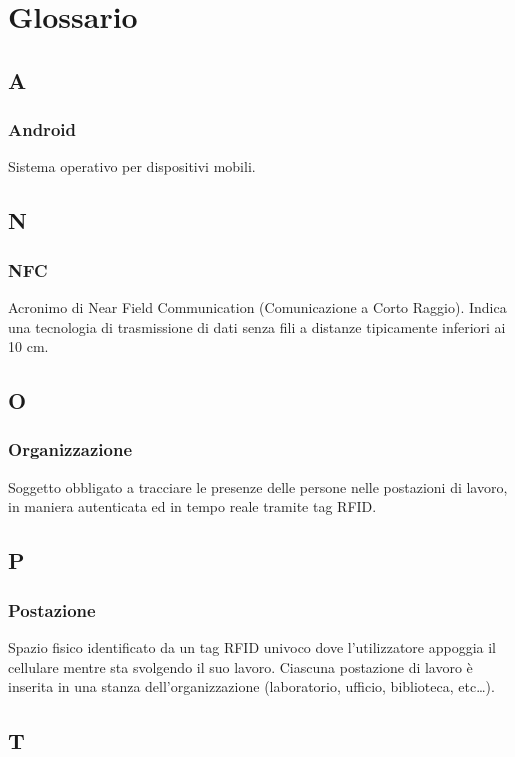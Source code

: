 \section{Glossario}


\subsection*{A}
\subsubsection*{Android} Sistema operativo per dispositivi mobili.

\subsection*{N}
\subsubsection*{NFC} Acronimo di Near Field Communication (Comunicazione a Corto Raggio). Indica una tecnologia di trasmissione di dati senza fili a distanze tipicamente inferiori ai 10 cm.

\subsection*{O}
\subsubsection*{Organizzazione} Soggetto obbligato a tracciare le presenze delle persone nelle postazioni di lavoro, in maniera autenticata ed in tempo reale tramite tag RFID. 
\subsection*{P}
\subsubsection*{Postazione} Spazio fisico identificato da un tag RFID univoco dove l’utilizzatore appoggia il cellulare mentre sta svolgendo il suo lavoro. Ciascuna postazione di lavoro è inserita in una stanza
dell'organizzazione (laboratorio, ufficio, biblioteca, etc\dots).
\subsection*{T}
